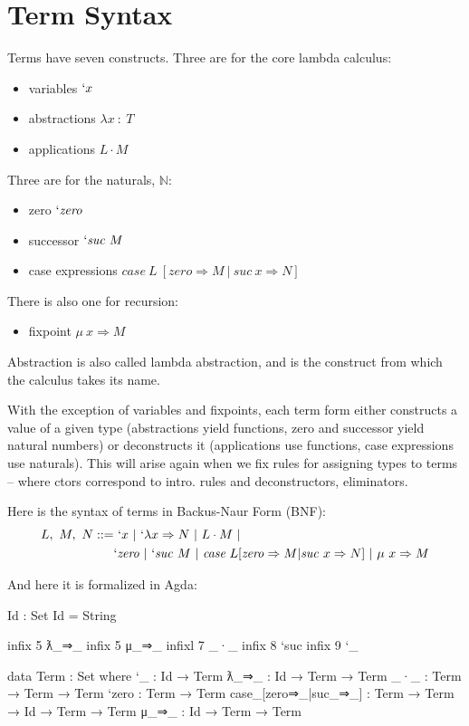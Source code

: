 \documentclass[runningheads]{llncs}
\begin{document}
\section{Term Syntax}

Terms have seven constructs. Three are for the core lambda calculus:
\begin{itemize}
\item variables $`x$ 
\item abstractions $λ x \ : \ T$ 
\item applications $L \cdot M$
\end{itemize}

Three are for the naturals, $\mathbb{N}$:
\begin{itemize}
\item zero $`\mathit{zero}$
\item successor $`\mathit{suc} \ M$ 
\item case expressions $\mathit{case} \ L \ 
[ \mathit{zero} \Rightarrow M \ | \ \mathit{suc} \ x \Rightarrow N ]$ 
\end{itemize}

There is also one for recursion: 
\begin{itemize}
\item fixpoint $\mu \ x \Rightarrow M$
\end{itemize}

Abstraction is also called lambda abstraction, and is the construct from which 
the calculus takes its name.

With the exception of variables and fixpoints, each term form either constructs
a value of a given type (abstractions yield functions, zero and successor yield 
natural numbers) or deconstructs it (applications use functions, case 
expressions use naturals). This will arise again when we fix rules for assigning
types to terms -- where ctors correspond to intro. rules and deconstructors, 
eliminators.

Here is the syntax of terms in Backus-Naur Form (BNF):
\begin{align*}
L, \ M, \ N ::= & \ `x \ | \ `\lambda x \Rightarrow N \ | \ L \cdot M \ | \\ 
            & `\mathit{zero} \ | \ `\mathit{suc} \ M \ | \ 
            \textit{case} \ L [ \mathit{zero} \Rightarrow M | \mathit{suc} \ x 
            \Rightarrow N ] \ | \ 
            \mu \ x \Rightarrow M 
\end{align*}

And here it is formalized in Agda:
\begin{code}
Id : Set
Id = String

infix  5 ƛ_⇒_
infix  5 μ_⇒_
infixl 7 _·_
infix  8 `suc
infix  9 `_

data Term : Set where 
    `_                      : Id → Term
    ƛ_⇒_                    : Id → Term → Term 
    _·_                     : Term → Term → Term 
    `zero                   : Term → Term 
    case_[zero⇒_|suc_⇒_]    : Term → Term → Id → Term → Term 
    μ_⇒_                    : Id → Term → Term
\end{code}
\end{document}

